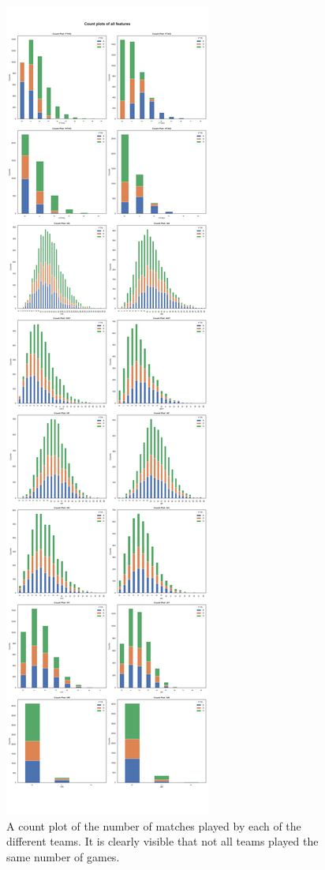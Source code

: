 \documentclass[a4paper,12pt]{article}
\begin{document}
	\begin{figure}[H]
		\renewcommand\thefigure{2.2}
		\centering
		
		\includegraphics[scale=0.32]{count_plot_all.png}
		\caption{A count plot of the number of matches played by each of the different teams. It is clearly visible that not all teams played the same number of games.}
	\end{figure}
	
\end{document}
